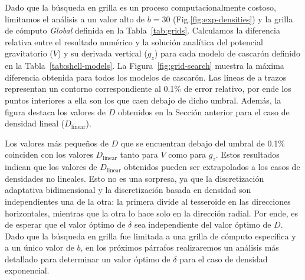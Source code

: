 Dado que la búsqueda en grilla es un proceso computacionalmente costoso,
limitamos el análisis a un valor alto de $b=30$ (Fig.\ref{fig:exp-densities})
y la grilla de cómputo \emph{Global} definida en la Tabla~\ref{tab:grids}.
Calculamos la diferencia relativa entre el resultado numérico y la solución
analítica del potencial gravitatorio ($V$) y su derivada vertical ($g_z$) para
cada modelo de cascarón definido en la Tabla~\ref{tab:shell-models}.
La Figura~\ref{fig:grid-search} muestra la máxima diferencia obtenida para
todos los modelos de cascarón.
Las líneas de a trazos representan un contorno correspondiente al 0.1\% de
error relativo, por ende los puntos interiores a ella son los que caen debajo
de dicho umbral.
Además, la figura destaca los valores de $D$ obtenidos en la Sección anterior
para el caso de densidad lineal ($D_\text{linear}$).

Los valores más pequeños de $D$ que se encuentran debajo del umbral de 0.1\%
coinciden con los valores $D_\text{linear}$ tanto para $V$ como para $g_z$.
Estos resultados indican que los valores de $D_\text{linear}$ obtenidos pueden
ser extrapolados a los casos de densidades no lineales.
Esto no es una sorpresa, ya que la discretización adaptativa bidimensional y la
discretización basada en densidad son independientes una de la otra: la primera
divide al tesseroide en las direcciones horizontales, mientras que la otra lo
hace solo en la dirección radial.
Por ende, es de esperar que el valor óptimo de $\delta$ sea independiente del
valor óptimo de $D$.
Dado que la búsqueda en grilla fue limitada a una grilla de cómputo específica
y a un único valor de $b$, en los próximos párrafos realizaremos un análisis
más detallado para determinar un valor óptimo de $\delta$ para el caso de
densidad exponencial.

